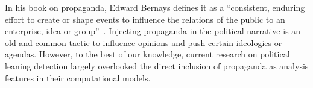







In his book on propaganda, Edward Bernays defines it as a ``consistent, enduring effort to create or shape events to influence the relations of the public to an enterprise, idea or group''~\cite{bernays}.
Injecting propaganda in the political narrative is an old and common tactic to influence opinions and push certain ideologies or agendas. However, to the best of our knowledge, current research on political leaning detection largely overlooked the direct inclusion of propaganda as analysis features in their computational models. 

